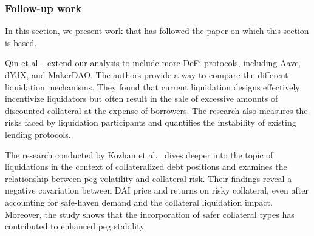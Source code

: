 





\subsubsection{Follow-up work}
In this section, we present work that has followed the paper on which this section is based.

Qin et al.~\cite{10.1145/3487552.3487811} extend our analysis to include more DeFi protocols, including Aave, dYdX, and MakerDAO.
The authors provide a way to compare the different liquidation mechanisms.
They found that current liquidation designs effectively incentivize liquidators but often result in the sale of excessive amounts of discounted collateral at the expense of borrowers.
The research also measures the risks faced by liquidation participants and quantifies the instability of existing lending protocols.

The research conducted by Kozhan et al.~\cite{kozhan2021decentralized} dives deeper into the topic of liquidations in the context of collateralized debt positions and examines the relationship between peg volatility and collateral risk.
Their findings reveal a negative covariation between DAI price and returns on risky collateral, even after accounting for safe-haven demand and the collateral liquidation impact.
Moreover, the study shows that the incorporation of safer collateral types has contributed to enhanced peg stability.
